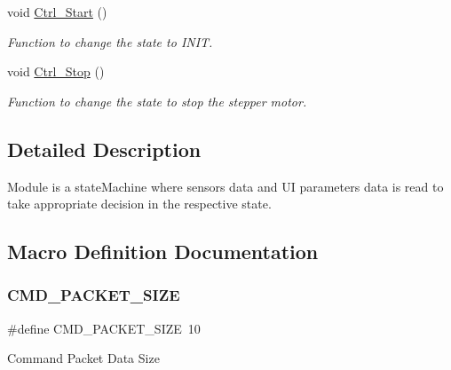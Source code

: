 \begin{DoxyCompactItemize}
void \hyperlink{group___state_control_module_ga62b8b9b48c52c1774d555e94b672856f}{Ctrl\+\_\+\+Start} ()
\begin{DoxyCompactList}\small\item\em Function to change the state to I\+N\+IT. \end{DoxyCompactList}\item 
void \hyperlink{group___state_control_module_ga9893b8ac36b61c5804fe404e9bfa1163}{Ctrl\+\_\+\+Stop} ()
\begin{DoxyCompactList}\small\item\em Function to change the state to stop the stepper motor. \end{DoxyCompactList}\end{DoxyCompactItemize}


\subsection{Detailed Description}
Module is a state\+Machine where sensors data and UI parameters data is read to take appropriate decision in the respective state. 

\subsection{Macro Definition Documentation}
\mbox{\label{group___state_control_module_ga79dc44f60cd39aecaa81ba77d440848b}} 
\subsubsection{\texorpdfstring{C\+M\+D\+\_\+\+P\+A\+C\+K\+E\+T\+\_\+\+S\+I\+ZE}{CMD\_PACKET\_SIZE}}
{\footnotesize\ttfamily \#define C\+M\+D\+\_\+\+P\+A\+C\+K\+E\+T\+\_\+\+S\+I\+ZE~10}

Command Packet Data Size \mbox{\label{group___state_control_module_ga2d0042b493e420e415586e0ed3e6159b}} 
